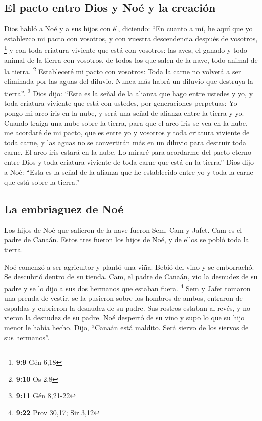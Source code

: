\begin{paracol}{2}
\hypertarget{el-pacto-entro-dios-y-nouxe9-y-la-creaciuxf3n}{%
\subsection{El pacto entro Dios y Noé y la
creación}\label{el-pacto-entro-dios-y-nouxe9-y-la-creaciuxf3n}}

 Dios habló a Noé y a sus hijos con él, diciendo:
 ``En cuanto a mí, he aquí que yo establezco mi pacto con
vosotros, y con vuestra descendencia después de vosotros, \footnote{\textbf{9:9}
  Gén 6,18}  y con toda criatura viviente que está con
vosotros: las aves, el ganado y todo animal de la tierra con vosotros,
de todos los que salen de la nave, todo animal de la tierra. \footnote{\textbf{9:10}
  Os 2,8}  Estableceré mi pacto con vosotros: Toda la
carne no volverá a ser eliminada por las aguas del diluvio. Nunca más
habrá un diluvio que destruya la tierra''. \footnote{\textbf{9:11} Gén
  8,21-22}  Dios dijo: ``Esta es la señal de la alianza
que hago entre ustedes y yo, y toda criatura viviente que está con
ustedes, por generaciones perpetuas:  Yo pongo mi arco
iris en la nube, y será una señal de alianza entre la tierra y yo.
 Cuando traiga una nube sobre la tierra, para que el arco
iris se vea en la nube,  me acordaré de mi pacto, que es
entre yo y vosotros y toda criatura viviente de toda carne, y las aguas
no se convertirán más en un diluvio para destruir toda carne.
 El arco iris estará en la nube. Lo miraré para acordarme
del pacto eterno entre Dios y toda criatura viviente de toda carne que
está en la tierra.''  Dios dijo a Noé: ``Esta es la señal
de la alianza que he establecido entre yo y toda la carne que está sobre
la tierra.''

\hypertarget{la-embriaguez-de-nouxe9}{%
\subsection{La embriaguez de Noé}\label{la-embriaguez-de-nouxe9}}

 Los hijos de Noé que salieron de la nave fueron Sem, Cam
y Jafet. Cam es el padre de Canaán.  Estos tres fueron
los hijos de Noé, y de ellos se pobló toda la tierra.

 Noé comenzó a ser agricultor y plantó una viña.
 Bebió del vino y se emborrachó. Se descubrió dentro de
su tienda.  Cam, el padre de Canaán, vio la desnudez de
su padre y se lo dijo a sus dos hermanos que estaban fuera. \footnote{\textbf{9:22}
  Prov 30,17; Sir 3,12}  Sem y Jafet tomaron una prenda
de vestir, se la pusieron sobre los hombros de ambos, entraron de
espaldas y cubrieron la desnudez de su padre. Sus rostros estaban al
revés, y no vieron la desnudez de su padre.  Noé despertó
de su vino y supo lo que su hijo menor le había hecho. 
Dijo, ``Canaán está maldito. Será siervo de los siervos de sus
hermanos''.


\end{paracol}
